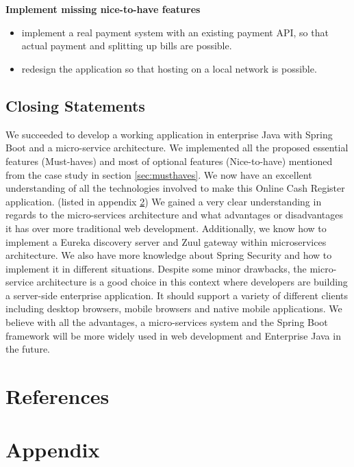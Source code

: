 \documentclass[12pt]{article}
\begin{document}
\begin{multicols}{2}
\\\\
\noindent\textbf{Implement missing nice-to-have features}
\begin{itemize}
	\item implement a real payment system with an existing payment API, so that actual payment and splitting up bills are possible.
	\item redesign the application so that hosting on a local network is possible.
\end{itemize}

\subsection{Closing Statements}
We succeeded to develop a working application in enterprise Java with Spring Boot and a micro-service architecture. We implemented all the proposed essential features (Must-haves) and most of optional features (Nice-to-have) mentioned from the case study in section \ref{sec:musthaves}. We now have an excellent understanding of all the technologies  involved to make this Online Cash Register application. (listed in appendix \ref{sec:techlist}) We gained a very clear understanding in regards to the micro-services architecture and what advantages or disadvantages it has over more traditional web development. Additionally, we know how to implement a Eureka discovery server and Zuul gateway within microservices architecture. We also have more knowledge about Spring Security and how to implement it in different situations. Despite some minor drawbacks, the micro-service architecture is a good choice in this context where developers are building a server-side enterprise application. It should support a variety of different clients including desktop browsers, mobile browsers and native mobile applications. We believe with all the advantages, a micro-services system and the Spring Boot framework will be more  widely used in web development and Enterprise Java in the future.


\end{multicols}

\newpage
\section{References}




\newpage
\section{Appendix}
\label{sec:techlist}
\end{document}
